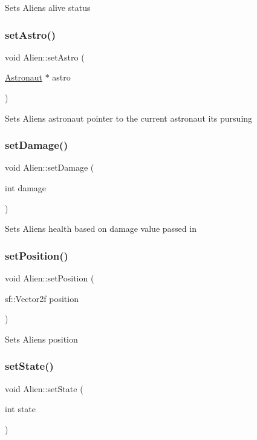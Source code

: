 Sets Aliens alive status \mbox{\label{class_alien_a23b7f6d84b71e233834a36ee37e90b14}} 
\subsubsection{\texorpdfstring{set\+Astro()}{setAstro()}}
{\footnotesize\ttfamily void Alien\+::set\+Astro (\begin{DoxyParamCaption}\item[{\hyperlink{class_astronaut}{Astronaut} $\ast$}]{astro }\end{DoxyParamCaption})}

Sets Aliens astronaut pointer to the current astronaut its pursuing \mbox{\label{class_alien_a5f1364d7d592e43230971365bb58d5a3}} 
\subsubsection{\texorpdfstring{set\+Damage()}{setDamage()}}
{\footnotesize\ttfamily void Alien\+::set\+Damage (\begin{DoxyParamCaption}\item[{int}]{damage }\end{DoxyParamCaption})}

Sets Aliens health based on damage value passed in \mbox{\label{class_alien_a751c54dcc0d77d92c6540b05b0fef50a}} 
\subsubsection{\texorpdfstring{set\+Position()}{setPosition()}}
{\footnotesize\ttfamily void Alien\+::set\+Position (\begin{DoxyParamCaption}\item[{sf\+::\+Vector2f}]{position }\end{DoxyParamCaption})}

Sets Aliens position \mbox{\label{class_alien_aead215fe05108897f31e12c9e58b0d90}} 
\subsubsection{\texorpdfstring{set\+State()}{setState()}}
{\footnotesize\ttfamily void Alien\+::set\+State (\begin{DoxyParamCaption}\item[{int}]{state }\end{DoxyParamCaption})}

